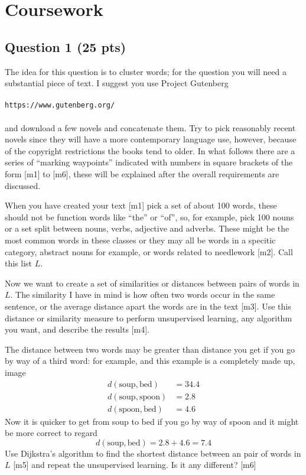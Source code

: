 \documentclass[12pt]{article}
\begin{document}
\section*{Coursework }

\subsection*{Question 1 (25 pts)}

The idea for this question is to cluster words; for the question you
will need a substantial piece of text. I suggest you use Project
Gutenberg\\ \\ \texttt{https://www.gutenberg.org/} \\ \\ and download
a few novels and concatenate them. Try to pick reasonably recent
novels since they will have a more contemporary language use, however,
because of the copyright restrictions the books tend to older. In what
follows there are a series of ``marking waypoints'' indicated with
numbers in square brackets of the form [m1] to [m6], these will be
explained after the overall requirements are discussed.

When you have created your text [m1] pick a set of about 100 words,
these should not be function words like ``the'' or ``of'', so, for
example, pick 100 nouns or a set split between nouns, verbs, adjective
and adverbs. These might be the most common words in these classes or
they may all be words in a specitic category, abstract nouns for
example, or words related to needlework [m2]. Call this list $L$.

Now we want to create a set of similarities or distances between pairs
of words in $L$. The similarity I have in mind is how often two words
occur in the same sentence, or the average distance apart the words
are in the text [m3]. Use this distance or similarity measure to
perform unsupervised learning, any algorithm you want, and describe
the results [m4].

The distance between two words may be greater than distance you get if
you go by way of a third word: for example, and this example is a
completely made up, image
\begin{align}
  d(\text{soup},\text{bed})&=34.4\\
  d(\text{soup},\text{spoon})&=2.8\\
  d(\text{spoon},\text{bed})&=4.6
\end{align}
Now it is quicker to get from soup to bed if you go by way of spoon and it might be more correct to regard
\begin{equation}
  d(\text{soup},\text{bed})=2.8+4.6=7.4
\end{equation}
Use Dijkstra's algorithm to find the shortest distance between an pair
of words in $L$ [m5] and repeat the unsupervised learning. Is it any
different? [m6]
\end{document}
